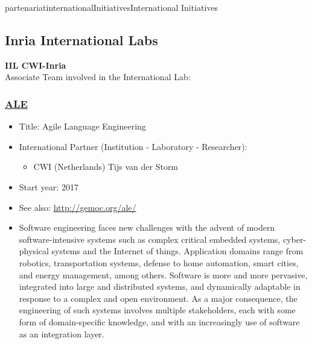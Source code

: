 \documentclass{ra2018}
\begin{document}

\begin{module}{partenariat}{internationalInitiatives}{International Initiatives}

\subsection{Inria International Labs}


\textbf{IIL CWI-Inria} \\   
 Associate Team involved in the International Lab: \\  
 \subsubsection{\href{http://gemoc.org/ale/}{ALE }}
\begin{itemize}
 \item Title: Agile Language Engineering
 \item International Partner (Institution -  Laboratory - Researcher):
 \begin{itemize}
    \item CWI (Netherlands)   Tijs van der Storm
 \end{itemize}
 \item Start year: 2017 \item See also: \url{http://gemoc.org/ale/}
 \item Software engineering faces new challenges with the advent of modern software-intensive systems such as complex critical embedded systems, cyber-physical systems and the Internet of things. Application domains range from robotics, transportation systems, defense to home automation, smart cities, and energy management, among others. Software is more and more pervasive, integrated into large and distributed systems, and dynamically adaptable in response to a complex and open environment. As a major consequence, the engineering of such systems involves multiple stakeholders, each with some form of domain-specific knowledge, and with an increasingly use of software as an integration layer.


\end{itemize}
\end{module}
\end{document}
